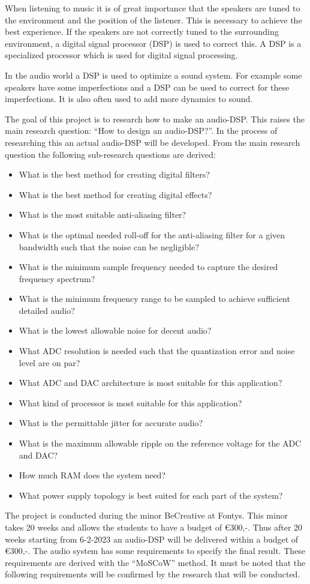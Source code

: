 When listening to music it is of great importance that the speakers are tuned to the environment and the position of the listener. This is necessary to achieve the best experience. If the speakers are not correctly tuned to the surrounding environment, a digital signal processor (DSP) is used to correct this. A DSP is a specialized processor which is used for digital signal processing.

\noindent
In the audio world a DSP is used to optimize a sound system. For example some speakers have some imperfections and a DSP can be used to correct for these imperfections. It is also often used to add more dynamics to sound.

\noindent
The goal of this project is to research how to make an audio-DSP. This raises the main research question: “How to design an audio-DSP?”. In the process of researching this an actual audio-DSP will be developed. From the main research question the following sub-research questions are derived:
\begin{itemize}
    \setlength\itemsep{-0.3em}
    \item What is the best method for creating digital filters?
    \item What is the best method for creating digital effects?
    \item What is the most suitable anti-aliasing filter?
    \item What is the optimal needed roll-off for the anti-aliasing filter for a given bandwidth such that the noise can be negligible?
    \item What is the minimum sample frequency needed to capture the desired frequency spectrum?
    \item What is the minimum frequency range to be sampled to achieve sufficient detailed audio? 
    \item What is the lowest allowable noise for decent audio? 
    \item What ADC resolution is needed such that the quantization error and noise level are on par? 
    \item What ADC and DAC architecture is most suitable for this application? 
    \item What kind of processor is most suitable for this application? 
    \item What is the permittable jitter for accurate audio? 
    \item What is the maximum allowable ripple on the reference voltage for the ADC and DAC? 
    \item How much RAM does the system need? 
    \item What power supply topology is best suited for each part of the system?
\end{itemize}
The project is conducted during the minor BeCreative at Fontys. This minor takes 20 weeks and allows the students to have a budget of €300,-. Thus after 20 weeks starting from 6-2-2023 an audio-DSP will be delivered within a budget of €300,-.
The audio system has some requirements to specify the final result. These requirements are derived with the “MoSCoW” method. It must be noted that the following requirements will be confirmed by the research that will be conducted.